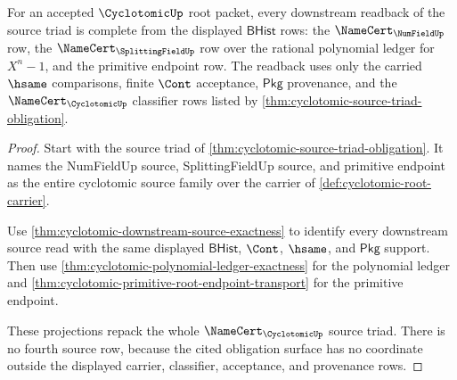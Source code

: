\begin{theorem}
\label{thm:cyclotomic-source-triad-readback-completeness}
For an accepted $\CyclotomicUp$ root packet, every downstream readback of the
source triad is complete from the displayed $\mathsf{BHist}$ rows: the
$\NameCert_{\NumFieldUp}$ row, the $\NameCert_{\SplittingFieldUp}$ row over the
rational polynomial ledger for $X^n-1$, and the primitive endpoint row. The
readback uses only the carried $\hsame$ comparisons, finite $\Cont$ acceptance,
$\mathsf{Pkg}$ provenance, and the $\NameCert_{\CyclotomicUp}$ classifier rows
listed by \autoref{thm:cyclotomic-source-triad-obligation}.
\end{theorem}
\begin{proof}
Start with the source triad of
\autoref{thm:cyclotomic-source-triad-obligation}. It names the NumFieldUp
source, SplittingFieldUp source, and primitive endpoint as the entire
cyclotomic source family over the carrier of
\autoref{def:cyclotomic-root-carrier}.

Use \autoref{thm:cyclotomic-downstream-source-exactness} to identify every
downstream source read with the same displayed $\mathsf{BHist}$, $\Cont$,
$\hsame$, and $\mathsf{Pkg}$ support. Then use
\autoref{thm:cyclotomic-polynomial-ledger-exactness} for the polynomial ledger
and \autoref{thm:cyclotomic-primitive-root-endpoint-transport} for the
primitive endpoint.

These projections repack the whole $\NameCert_{\CyclotomicUp}$ source triad.
There is no fourth source row, because the cited obligation surface has no
coordinate outside the displayed carrier, classifier, acceptance, and
provenance rows.
\end{proof}

